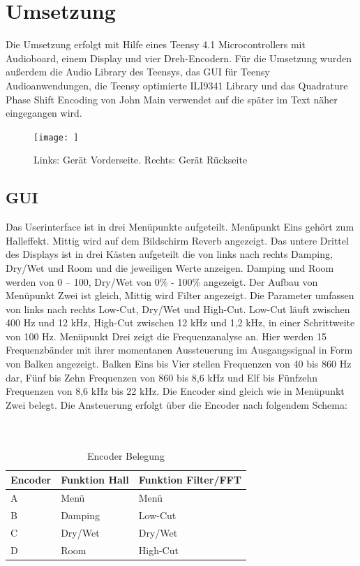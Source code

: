\documentclass[12pt]{article}
\begin{document}
\section{Umsetzung}
Die Umsetzung erfolgt mit Hilfe eines Teensy 4.1 Microcontrollers mit Audioboard, einem Display und vier Dreh-Encodern.
Für die Umsetzung wurden außerdem die Audio Library des Teensys, das GUI für Teensy Audioanwendungen, die Teensy optimierte ILI9341 Library und das Quadrature Phase Shift Encoding von John Main verwendet auf die später im Text näher eingegangen wird.
\begin{figure}[h]
  \centering
  \caption{Links: Gerät Vorderseite. Rechts: Gerät Rückseite}
  \texttt{[image: ]}
\end{figure}
\subsection{GUI}
Das Userinterface ist in drei Menüpunkte aufgeteilt. Menüpunkt Eins gehört zum Halleffekt. Mittig wird auf dem Bildschirm \glq Reverb\grq{}\: angezeigt. 
Das untere Drittel des Displays ist in drei Kästen aufgeteilt die von links nach rechts Damping, Dry/Wet und Room und die jeweiligen Werte anzeigen. 
Damping und Room werden von 0 – 100, Dry/Wet von 0\% - 100\% angezeigt. Der Aufbau von Menüpunkt Zwei ist gleich, Mittig wird \glq Filter\grq{}\: angezeigt. 
Die Parameter umfassen von links nach rechts Low-Cut, Dry/Wet und High-Cut. Low-Cut läuft zwischen 400 Hz und 12 kHz, High-Cut zwischen 12 kHz und 1,2 kHz, in einer Schrittweite von 100 Hz. 
Menüpunkt Drei zeigt die Frequenzanalyse an. Hier werden 15 Frequenzbänder mit ihrer momentanen Aussteuerung im Ausgangssignal in Form von Balken angezeigt. Balken Eins bis Vier stellen Frequenzen von 40 bis 860 Hz dar, Fünf bis Zehn Frequenzen von 860 bis 8,6 kHz und Elf bis Fünfzehn Frequenzen von 8,6 kHz bis 22 kHz.
Die Encoder sind gleich wie in Menüpunkt Zwei belegt.
Die Ansteuerung erfolgt über die Encoder nach folgendem Schema:
\\
\\
\\
\begin{table}[h]
    \centering
    \caption{Encoder Belegung}
    \label{tbl:encoderbelegung}
    \begin{tabular}{l|l|l}
      \textbf{Encoder}  & \textbf{Funktion Hall} & \textbf{Funktion Filter/FFT}\\
      \hline
      A & Menü & Menü \\
   
      B & Damping & Low-Cut \\
   
      C & Dry/Wet & Dry/Wet \\
      
      D & Room & High-Cut \\
     

    \end{tabular}    

\end{table}
\end{document}
